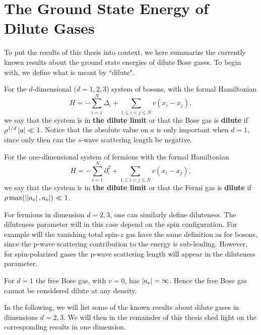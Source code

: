 \section{The Ground State Energy of Dilute Gases}
To put the results of this thesis into context, we here summarize the currently known results about the ground state energies of dilute Bose gases. To begin with, we define what is meant by ``dilute".
\begin{definition}
	For the $ d $-dimensional ($ d=1,2,3 $) system of bosons, with the formal Hamiltonian \begin{equation}
	H=-\sum_{i=1}^{N}\Delta_i+\sum_{1\leq i<j\leq N}v(x_i-x_j),
	\end{equation}
	we say that the system is in \textbf{ the dilute limit} or that the Bose gas is \textbf{dilute} if $ \rho^{1/d} \left\lvert a \right\rvert\ll 1 $. Notice that the absolute value on $ a $ is only important when $ d=1 $, since only then can the $ s $-wave scattering length be negative.
\end{definition}
\begin{definition}
	For the one-dimensional system of fermions with the formal Hamiltonian \begin{equation}
	H=-\sum_{i=1}^{N}\partial^2_i+\sum_{1\leq i<j\leq N}v(x_i-x_j),
	\end{equation}
	we say that the system is in \textbf{ the dilute limit} or that the Fermi gas is \textbf{dilute} if $ \rho \max(\left\lvert \left\lvert a_e \right\rvert,a_o \right\rvert)\ll 1 $.
\end{definition}
\begin{remark}
	For fermions in dimension $ d=2,3 $, one can similarly define diluteness. The diluteness parameter will in this case depend on the spin configuration. For example will the vanishing total spin-$ z $ gas have the same definition as for bosons, since the p-wave scattering contribution to the energy is sub-leading. However, for spin-polarized gases the p-wave scattering length will appear in the diluteness parameter.
\end{remark}
\begin{remark}
	For $ d=1 $ the free Bose gas, \ie with $ v=0 $, has $ \left\lvert a_e \right\rvert=\infty $. Hence the free Bose gas cannot be considered dilute at any density.
\end{remark}
In the following, we will list some of the known results about dilute gases in dimensions $ d=2,3 $. We will then in the remainder of this thesis shed light on the corresponding results in one dimension.
